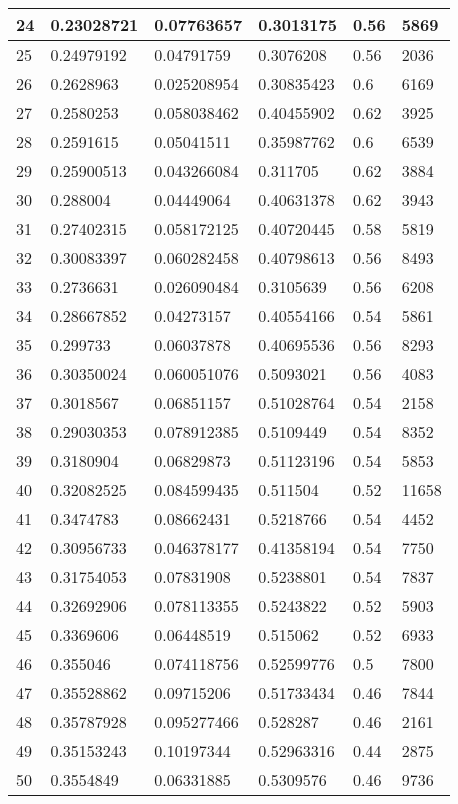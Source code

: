 \begin{longtable}{|l|l|l|l|l|l|}
24 & 0.23028721 & 0.07763657 & 0.3013175 & 0.56 & 5869 \\ \hline 
25 & 0.24979192 & 0.04791759 & 0.3076208 & 0.56 & 2036 \\ \hline 
26 & 0.2628963 & 0.025208954 & 0.30835423 & 0.6 & 6169 \\ \hline 
27 & 0.2580253 & 0.058038462 & 0.40455902 & 0.62 & 3925 \\ \hline 
28 & 0.2591615 & 0.05041511 & 0.35987762 & 0.6 & 6539 \\ \hline 
29 & 0.25900513 & 0.043266084 & 0.311705 & 0.62 & 3884 \\ \hline 
30 & 0.288004 & 0.04449064 & 0.40631378 & 0.62 & 3943 \\ \hline 
31 & 0.27402315 & 0.058172125 & 0.40720445 & 0.58 & 5819 \\ \hline 
32 & 0.30083397 & 0.060282458 & 0.40798613 & 0.56 & 8493 \\ \hline 
33 & 0.2736631 & 0.026090484 & 0.3105639 & 0.56 & 6208 \\ \hline 
34 & 0.28667852 & 0.04273157 & 0.40554166 & 0.54 & 5861 \\ \hline 
35 & 0.299733 & 0.06037878 & 0.40695536 & 0.56 & 8293 \\ \hline 
36 & 0.30350024 & 0.060051076 & 0.5093021 & 0.56 & 4083 \\ \hline 
37 & 0.3018567 & 0.06851157 & 0.51028764 & 0.54 & 2158 \\ \hline 
38 & 0.29030353 & 0.078912385 & 0.5109449 & 0.54 & 8352 \\ \hline 
39 & 0.3180904 & 0.06829873 & 0.51123196 & 0.54 & 5853 \\ \hline 
40 & 0.32082525 & 0.084599435 & 0.511504 & 0.52 & 11658 \\ \hline 
41 & 0.3474783 & 0.08662431 & 0.5218766 & 0.54 & 4452 \\ \hline 
42 & 0.30956733 & 0.046378177 & 0.41358194 & 0.54 & 7750 \\ \hline 
43 & 0.31754053 & 0.07831908 & 0.5238801 & 0.54 & 7837 \\ \hline 
44 & 0.32692906 & 0.078113355 & 0.5243822 & 0.52 & 5903 \\ \hline 
45 & 0.3369606 & 0.06448519 & 0.515062 & 0.52 & 6933 \\ \hline 
46 & 0.355046 & 0.074118756 & 0.52599776 & 0.5 & 7800 \\ \hline 
47 & 0.35528862 & 0.09715206 & 0.51733434 & 0.46 & 7844 \\ \hline 
48 & 0.35787928 & 0.095277466 & 0.528287 & 0.46 & 2161 \\ \hline 
49 & 0.35153243 & 0.10197344 & 0.52963316 & 0.44 & 2875 \\ \hline 
50 & 0.3554849 & 0.06331885 & 0.5309576 & 0.46 & 9736 \\ \hline 
\end{longtable}